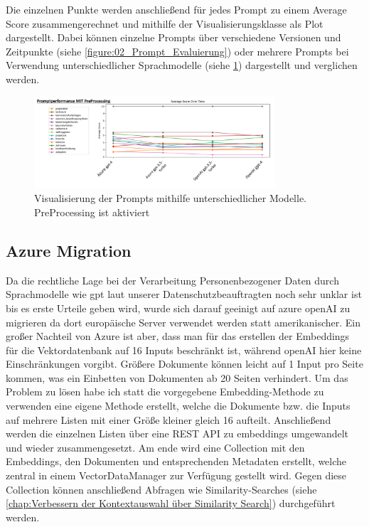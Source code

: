 Die einzelnen Punkte werden anschließend für jedes Prompt zu einem Average Score zusammengerechnet und mithilfe der Visualisierungsklasse als Plot dargestellt. 
Dabei können einzelne Prompts über verschiedene Versionen und Zeitpunkte (siehe \ref{figure:02_Prompt_Evaluierung}) oder mehrere Prompts bei Verwendung 
unterschiedlicher Sprachmodelle (siehe \ref{fig:04_Prompt_Evaluierung-MitPreProcessing}) dargestellt und verglichen werden.

\begin{figure}[h]
    \centering
    \includegraphics[width=0.8\textwidth]{figures/04_Prompt_Evaluierung-MitPreProcessing.png}
    \caption{Visualisierung der Prompts mithilfe unterschiedlicher Modelle. PreProcessing ist aktiviert}
    \label{fig:04_Prompt_Evaluierung-MitPreProcessing}    %
\end{figure}

\subsection{Azure Migration}
Da die rechtliche Lage bei der Verarbeitung Personenbezogener Daten durch Sprachmodelle wie gpt laut unserer
Datenschutzbeauftragten noch sehr unklar ist bis es erste Urteile geben wird, wurde sich darauf geeinigt auf azure
openAI zu migrieren da dort europäische Server verwendet werden statt amerikanischer. Ein großer Nachteil von Azure ist
aber, dass man für das erstellen der Embeddings für die Vektordatenbank auf 16 Inputs beschränkt ist, während openAI
hier keine Einschränkungen vorgibt. Größere Dokumente können leicht auf 1 Input pro Seite kommen, was ein Einbetten von
Dokumenten ab 20 Seiten verhindert. Um das Problem zu lösen habe ich statt die vorgegebene Embedding-Methode zu
verwenden eine eigene Methode erstellt, welche die Dokumente bzw. die Inputs auf mehrere Listen mit einer Größe kleiner
gleich 16 aufteilt. Anschließend werden die einzelnen Listen über eine REST API zu embeddings umgewandelt und wieder
zusammengesetzt. Am ende wird eine Collection mit den Embeddings, den Dokumenten und entsprechenden Metadaten erstellt,
welche zentral in einem VectorDataManager zur Verfügung gestellt wird. Gegen diese Collection können anschließend
Abfragen wie Similarity-Searches (siehe \ref{chap:Verbessern der Kontextauswahl über Similarity Search}) durchgeführt
werden. 

